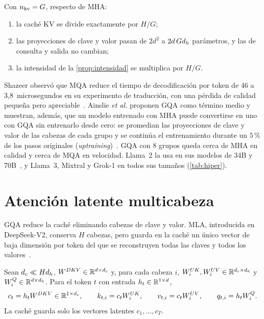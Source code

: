 \begin{proposicion}\label{prop:gqa}
Con $n_{\mathrm{kv}}=G$, respecto de MHA:
\begin{enumerate}
  \item la caché KV se divide exactamente por $H/G$;
  \item las proyecciones de clave y valor pasan de $2d^{2}$ a $2d\,Gd_{h}$ parámetros, y las de consulta y salida no cambian;
  \item la intensidad de la \cref{prop:intensidad} se multiplica por $H/G$.
\end{enumerate}
\end{proposicion}

\addtocounter{figure}{1}%

Shazeer observó que MQA reduce el tiempo de decodificación por token de 46 a 3,8~microsegundos en su experimento de traducción, con una pérdida de calidad pequeña pero apreciable~\cite[§4.2 y §4.3]{mqa}. Ainslie \emph{et al.} proponen GQA como término medio y muestran, además, que un modelo entrenado con MHA puede convertirse en uno con GQA sin entrenarlo desde cero: se promedian las proyecciones de clave y valor de las cabezas de cada grupo y se continúa el entrenamiento durante un $5\,\%$ de los pasos originales (\emph{uptraining})~\cite[§2.1 y §3.1]{gqa}. GQA con 8 grupos queda cerca de MHA en calidad y cerca de MQA en velocidad. Llama~2 la usa en sus modelos de 34B y 70B~\cite[tabla~1]{llama2}, y Llama~3, Mixtral y Grok-1 en todos sus tamaños (\cref{tab:hiper}).

\addtocounter{definicion}{1}%

\section{Atención latente multicabeza}

GQA reduce la caché eliminando cabezas de clave y valor. MLA, introducida en DeepSeek-V2, conserva $H$ cabezas, pero guarda en la caché un único vector de baja dimensión por token del que se reconstruyen todas las claves y todos los valores~\cite[§2.1.2]{deepseekv2}.

\begin{definicion}\label{def:mla}
Sean $d_{c}\ll Hd_{h}$, $W^{DKV}\in\mathbb{R}^{d\times d_{c}}$ y, para cada cabeza $i$, $W^{UK}_i,W^{UV}_i\in\mathbb{R}^{d_{c}\times d_{h}}$ y $W^{Q}_i\in\mathbb{R}^{d\times d_{h}}$. Para el token $t$ con entrada $h_t\in\mathbb{R}^{1\times d}$,
\[
c_t=h_tW^{DKV}\in\mathbb{R}^{1\times d_{c}},\qquad k_{t,i}=c_tW^{UK}_i,\qquad v_{t,i}=c_tW^{UV}_i,\qquad q_{t,i}=h_tW^{Q}_i .
\]
La caché guarda solo los vectores latentes $c_1,\dots,c_T$.
\end{definicion}

